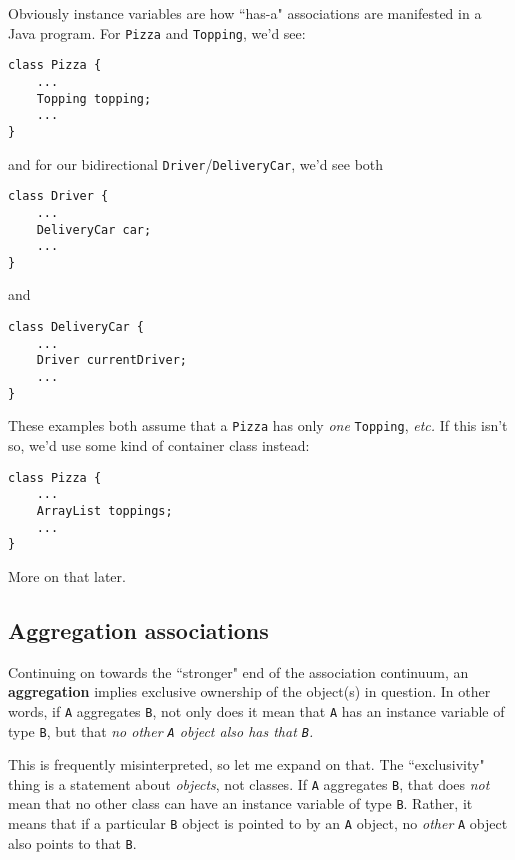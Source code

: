 Obviously instance variables are how ``has-a" associations are manifested in a
Java program. For \texttt{Pizza} and \texttt{Topping}, we'd see:

\begin{Verbatim}[fontsize=\scriptsize,samepage=true,frame=single]
class Pizza {
    ...
    Topping topping;
    ...
}
\end{Verbatim}

and for our bidirectional \texttt{Driver}/\texttt{DeliveryCar}, we'd see both
\begin{Verbatim}[fontsize=\scriptsize,samepage=true,frame=single]
class Driver {
    ...
    DeliveryCar car;
    ...
}
\end{Verbatim}

and

\begin{Verbatim}[fontsize=\scriptsize,samepage=true,frame=single]
class DeliveryCar {
    ...
    Driver currentDriver;
    ...
}
\end{Verbatim}

These examples both assume that a \texttt{Pizza} has only \textit{one}
\texttt{Topping}, \textit{etc.} If this isn't so, we'd use some kind of
container class instead:

\begin{Verbatim}[fontsize=\scriptsize,samepage=true,frame=single]
class Pizza {
    ...
    ArrayList toppings;
    ...
}
\end{Verbatim}

More on that later.

\subsection{Aggregation associations}

Continuing on towards the ``stronger" end of the association continuum, an
\textbf{aggregation} implies exclusive ownership of the object(s) in question.
In other words, if \texttt{A} aggregates \texttt{B}, not only does it mean
that \texttt{A} has an instance variable of type \texttt{B}, but that
\textit{no other \texttt{A} object also has that \texttt{B}.}

This is frequently misinterpreted, so let me expand on that. The
``exclusivity" thing is a statement about \textit{objects}, not classes. If
\texttt{A} aggregates \texttt{B}, that does \textit{not} mean that no other
class can have an instance variable of type \texttt{B}. Rather, it means that
if a particular \texttt{B} object is pointed to by an \texttt{A} object, no
\textit{other} \texttt{A} object also points to that \texttt{B}.

